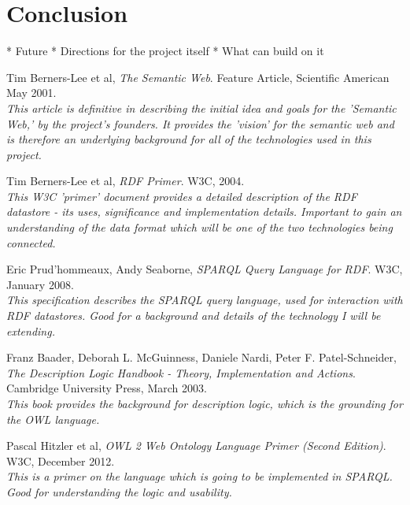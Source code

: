 \documentclass{article}
\begin{document}
\section{Conclusion}

* Future
* Directions for the project itself
* What can build on it

\begin{thebibliography}{9}

  Tim Berners-Lee et al,
  \emph{The Semantic Web}.
  Feature Article, Scientific American
  May 2001.
    \\  
    \emph{This article is definitive in describing the initial idea and goals for the
    'Semantic Web,' by the project's founders. It provides the 'vision' for the
    semantic web and is therefore an underlying background for all of the
    technologies used in this project.}

 Tim Berners-Lee et al,
 \emph{RDF Primer}.
 W3C,
 2004.
   \\ 
   \emph{This W3C 'primer' document provides a detailed description of the RDF
   datastore - its uses, significance and implementation details. Important to
   gain an understanding of the data format which will be one of the two
   technologies being connected.}

  Eric Prud'hommeaux, Andy Seaborne,
  \emph{SPARQL Query Language for RDF}.
  W3C,
  January 2008.
    \\ 
    \emph{This specification describes the SPARQL query language, used for
    interaction with RDF datastores. Good for a background and details of 
    the technology I will be extending.}

 Franz Baader, Deborah L. McGuinness, Daniele Nardi, Peter F. Patel-Schneider,
 \emph{The Description Logic Handbook - Theory, Implementation and Actions}.
 Cambridge University Press,
 March 2003.
   \\ 
   \emph{This book provides the background for description logic, which is the
   grounding for the OWL language.}

  Pascal Hitzler et al,
  \emph{OWL 2 Web Ontology Language Primer (Second Edition)}.
  W3C,
  December 2012.
  \\ 
  \emph{This is a primer on the language which is going to be implemented in
  SPARQL. Good for understanding the logic and usability.}

\end{thebibliography}
\end{document}
